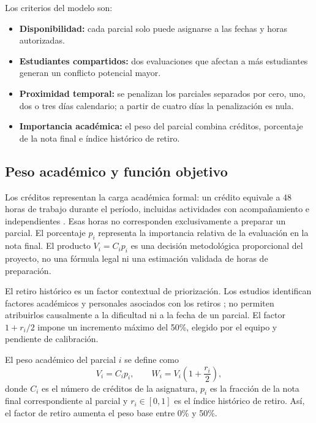 \documentclass[conference]{IEEEtran}
\begin{document}
Los criterios del modelo son:
\begin{itemize}
  \item \textbf{Disponibilidad:} cada parcial solo puede asignarse a las fechas y horas autorizadas.
  \item \textbf{Estudiantes compartidos:} dos evaluaciones que afectan a más estudiantes generan un conflicto potencial mayor.
  \item \textbf{Proximidad temporal:} se penalizan los parciales separados por cero, uno, dos o tres días calendario; a partir de cuatro días la penalización es nula.
  \item \textbf{Importancia académica:} el peso del parcial combina créditos, porcentaje de la nota final e índice histórico de retiro.
\end{itemize}

\subsection{Peso académico y función objetivo}
Los créditos representan la carga académica formal: un crédito equivale a 48 horas de trabajo durante el período, incluidas actividades con acompañamiento e independientes \cite{decreto1330}. Esas horas no corresponden exclusivamente a preparar un parcial. El porcentaje $p_i$ representa la importancia relativa de la evaluación en la nota final. El producto $V_i=C_i p_i$ es una decisión metodológica proporcional del proyecto, no una fórmula legal ni una estimación validada de horas de preparación.

El retiro histórico es un factor contextual de priorización. Los estudios identifican factores académicos y personales asociados con los retiros \cite{boldt,hachey,aslanian}; no permiten atribuirlos causalmente a la dificultad ni a la fecha de un parcial. El factor $1+r_i/2$ impone un incremento máximo del 50\%, elegido por el equipo y pendiente de calibración.

El peso académico del parcial $i$ se define como
\begin{equation}
  V_i=C_i p_i, \qquad W_i = V_i\left(1+\frac{r_i}{2}\right),
\end{equation}
donde $C_i$ es el número de créditos de la asignatura, $p_i$ es la fracción de la nota final correspondiente al parcial y $r_i\in[0,1]$ es el índice histórico de retiro. Así, el factor de retiro aumenta el peso base entre 0\% y 50\%.
\end{document}
